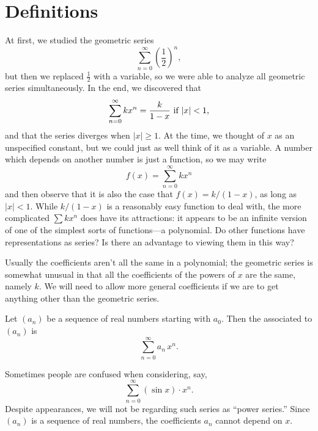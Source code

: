 \section{Definitions}
\nobreak
At first, we studied the geometric series
$$
  \sum_{n=0}^\infty \left(\frac{1}{2}\right)^n,
$$
but then we replaced $\frac{1}{2}$ with a variable, so we were able to
analyze all geometric series simultaneously.  In the end, we
discovered that
$$
  \sum_{n=0}^\infty kx^n = {k\over 1-x} \mbox{ if $|x| < 1$,}
$$
and that the series diverges when $|x|\ge 1$. At the time,
we thought of $x$ as an unspecified constant, but we could just as
well think of it as a variable.  A number which depends on another
number is just a function, so we may write
$$
  f(x) = \sum_{n=0}^\infty kx^n
$$
and then observe that it is also the case that $f(x) = k/(1-x)$, as
long as $|x|<1$. While $k/(1-x)$ is a reasonably easy function to deal
with, the more complicated $\sum kx^n$ does have its attractions: it
appears to be an infinite version of one of the simplest sorts of
functions---a polynomial. Do other functions have representations as
series? Is there an advantage to viewing them in this way?

Usually the coefficients aren't all the same in a polynomial; the
geometric series is somewhat unusual in that all the coefficients of
the powers of $x$ are the same, namely $k$.  We will need to allow more
general coefficients if we are to get anything other than the
geometric series.

\begin{definition}
  \label{defn:power-series}
  Let $(a_n)$ be a sequence of real numbers starting with $a_0$.  Then
  the  associated to $(a_n)$ is
  $$
  \sum_{n=0}^\infty a_n \, x^n.
  $$ 
\end{definition}

Sometimes people are confused when considering, say,
$$
\sum_{n=0}^\infty (\sin x) \cdot x^n.
$$
Despite appearances, we will not be regarding such series as ``power
series.''  Since $(a_n)$ is a sequence of real numbers, the
coefficients $a_n$ cannot depend on $x$.

